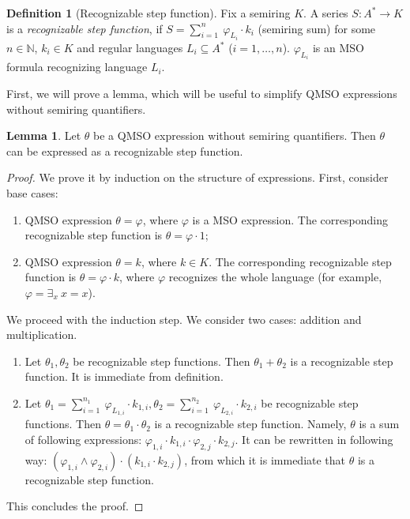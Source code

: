 \documentclass[12pt]{article}
\theoremstyle{definition}
\newtheorem{definition}{Definition}[section]
\newtheorem{lemma}[theorem]{Lemma}
\begin{document}
\begin{definition}[Recognizable step function]
    \label{DefRecStepFun}
    Fix a semiring $K$.
    A series $S: A^* \rightarrow K$ is a \emph{recognizable step function}, if $S = \sum_{i = 1}^{n} \ \varphi_{L_i} \cdot k_i$ (semiring sum) for some $n \in \mathbb{N}$, $k_i \in K$ and regular languages $L_i \subseteq A^*$ ($i=1,\ldots,n$). $\varphi_{L_i}$ is an MSO formula recognizing language $L_i$.
\end{definition}

First, we will prove a lemma, which will be useful to simplify QMSO expressions without semiring quantifiers.

\begin{lemma}
    \label{QFreeRecognizable}
    Let $\theta$ be a QMSO expression without semiring quantifiers. Then $\theta$ can be expressed as a recognizable step function.
\end{lemma}

\begin{proof}
    We prove it by induction on the structure of expressions.
    First, consider base cases:
    \begin{enumerate}
        \item QMSO expression $\theta = \varphi$, where $\varphi$ is a MSO expression. The corresponding recognizable step function is $\theta = \varphi \cdot 1$;
        \item QMSO expression $\theta = k$, where $k \in K$. The corresponding recognizable step function is $\theta = \varphi \cdot k$, where $\varphi$ recognizes the whole language (for example, $\varphi = \exists_x \ x = x$).
    \end{enumerate}

    We proceed with the induction step. We consider two cases: addition and multiplication.
    \begin{enumerate}
        \item Let $\theta_1, \theta_2$ be recognizable step functions. Then $\theta_1 + \theta_2$ is a recognizable step function. It is immediate from definition.
        \item Let $\theta_1 = \sum_{i = 1}^{n_1} \ \varphi_{L_{1,i}} \cdot k_{1,i}, \theta_2 = \sum_{i = 1}^{n_2} \ \varphi_{L_{2,i}} \cdot k_{2,i}$ be recognizable step functions. Then $\theta = \theta_1 \cdot \theta_2$ is a recognizable step function. Namely, $\theta$ is a sum of following expressions: $\varphi_{1,i} \cdot k_{1, i} \cdot \varphi_{2,j} \cdot k_{2,j}$. It can be rewritten in following way: $(\varphi_{1,i} \land \varphi_{2,i}) \cdot (k_{1,i} \cdot k_{2,j})$, from which it is immediate that $\theta$ is a recognizable step function.
    \end{enumerate}
This concludes the proof.
\end{proof}
\end{document}
